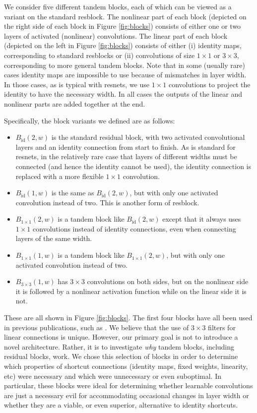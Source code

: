 \documentclass{article} %
\begin{document}
We consider five different tandem blocks, each of which can be viewed as a variant on the standard resblock. The nonlinear part of each block (depicted on the right side of each block in Figure \ref{fig:blocks}) consists of either one or two layers of activated (nonlinear) convolutions. The linear part of each block (depicted on the left in Figure \ref{fig:blocks}) consists of either (i) identity maps, corresponding to standard resblocks  or (ii) convolutions of size $1\times 1$ or $3\times 3$, corresponding to more general tandem blocks.  Note that in some (usually rare) cases identity maps are impossible to use because of mismatches in layer width.  In those cases, as is typical with resnets, we use $1\times 1$ convolutions to project the identity to have the necessary width.  In all cases the outputs of the linear and nonlinear parts are added together at the end.

Specifically, the block variants we defined are as follows:
\begin{itemize}
  \item $B_{\operatorname{id}}(2,w)$ is the standard residual block, with two activated convolutional layers and an identity connection from start to finish. As is standard for resnets, in the relatively rare case that layers of different widths must be connected (and hence the identity cannot be used), the identity connection is replaced with a more flexible $1\times 1$ convolution.
   \item $B_{\operatorname{id}}(1,w)$ is the same as $B_{\operatorname{id}}(2,w)$, but with only one activated convolution instead of two.  This is another form of resblock.
   \item $B_{1\times 1}(2,w)$ is a tandem block like $B_{\operatorname{id}}(2,w)$ except that it always uses $1\times 1$ convolutions instead of identity connections, even when connecting layers of the same width.
  \item $B_{1\times 1}(1,w)$ is a tandem block like  $B_{1\times 1}(2,w)$, but with only one activated convolution instead of two.
  \item $B_{3\times 3}(1,w)$ has $3\times 3$ convolutions on both  sides, but on the nonlinear side it is followed by a nonlinear activation function while on the linear side it is not. 
\end{itemize}
These are all shown in Figure \ref{fig:blocks}. The first four blocks have all been used in previous publications, such as \cite{IdentityMappings}. We believe that the use of $3 \times 3$ filters for linear connections is unique. However, our primary goal is not to introduce a novel architecture. Rather, it is to investigate \emph{why} tandem blocks, including residual blocks, work. We chose this selection of blocks in order to determine which properties of shortcut connections (identity maps, fixed weights, linearity, etc) were necessary and which were unnecessary or even suboptimal. In particular, these blocks were ideal for determining whether learnable convolutions are just a necessary evil for accommodating occasional changes in layer width or whether they are a viable, or even superior, alternative to identity shortcuts. 
\end{document}
